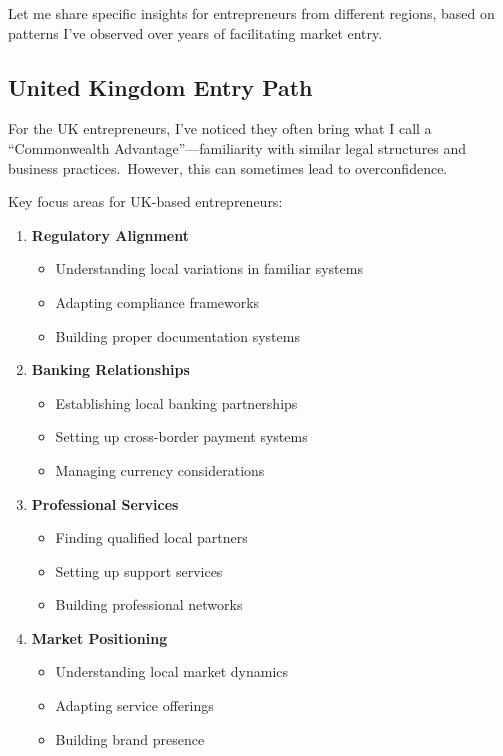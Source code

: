 Let me share specific insights for entrepreneurs from different regions, based on patterns I've observed over years of facilitating market entry.

\subsection{United Kingdom Entry Path}\label{subsec:uk-entry-path}

For the UK entrepreneurs, I've noticed they often bring what I call a ``Commonwealth Advantage''—familiarity with similar legal structures and business practices.\ However, this can sometimes lead to overconfidence.

Key focus areas for UK-based entrepreneurs:

\begin{enumerate}
    \item \textbf{Regulatory Alignment}
    \begin{itemize}
        \item Understanding local variations in familiar systems
        \item Adapting compliance frameworks
        \item Building proper documentation systems
    \end{itemize}
    \item \textbf{Banking Relationships}
    \begin{itemize}
        \item Establishing local banking partnerships
        \item Setting up cross-border payment systems
        \item Managing currency considerations
    \end{itemize}
    \item \textbf{Professional Services}
    \begin{itemize}
        \item Finding qualified local partners
        \item Setting up support services
        \item Building professional networks
    \end{itemize}
    \item \textbf{Market Positioning}
    \begin{itemize}
        \item Understanding local market dynamics
        \item Adapting service offerings
        \item Building brand presence
    \end{itemize}
\end{enumerate}

